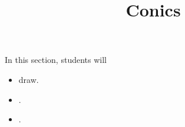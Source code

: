 \documentclass{ximera}
\title{Conics}
\begin{document}
\begin{abstract}
%
\end{abstract}
\maketitle























\begin{sectionOutcomes}
In this section, students will 

\begin{itemize}
\item draw.
\item .
\item .
\end{itemize}
\end{sectionOutcomes}
\end{document}
